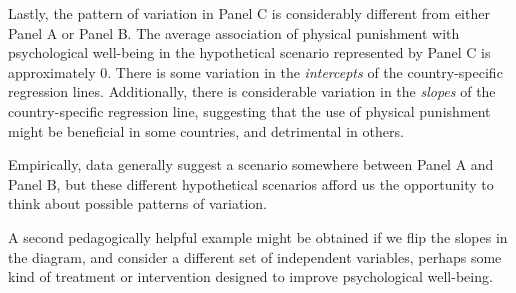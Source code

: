 \documentclass[
  letterpaper,
  DIV=11,
  numbers=noendperiod]{scrreprt}
\begin{document}
Lastly, the pattern of variation in Panel C is considerably different
from either Panel A or Panel B. The average association of physical
punishment with psychological well-being in the hypothetical scenario
represented by Panel C is approximately 0. There is some variation in
the \emph{intercepts} of the country-specific regression lines.
Additionally, there is considerable variation in the \emph{slopes} of
the country-specific regression line, suggesting that the use of
physical punishment might be beneficial in some countries, and
detrimental in others.

Empirically, data generally suggest a scenario somewhere between Panel A
and Panel B, but these different hypothetical scenarios afford us the
opportunity to think about possible patterns of variation.

A second pedagogically helpful example might be obtained if we flip the
slopes in the diagram, and consider a different set of independent
variables, perhaps some kind of treatment or intervention designed to
improve psychological well-being.
\end{document}
